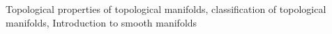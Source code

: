 Topological properties of topological manifolds, classification of topological manifolds, Introduction to smooth manifolds